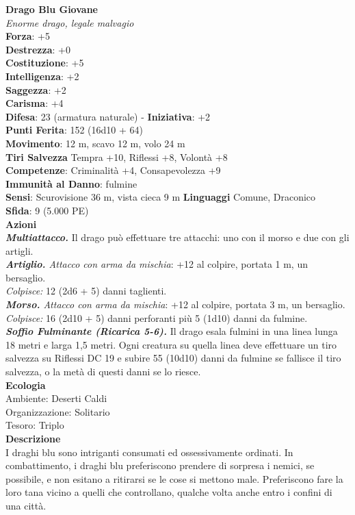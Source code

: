 \begin{multicols}{2}
\medskip\textbf{Drago Blu Giovane}\\
\emph{Enorme drago, legale malvagio}\\
\textbf{Forza}: +5\\
\textbf{Destrezza}: +0\\
\textbf{Costituzione}: +5\\
\textbf{Intelligenza}: +2\\
\textbf{Saggezza}: +2\\
\textbf{Carisma}: +4\\
\textbf{Difesa}: 23 (armatura naturale) - \textbf{Iniziativa}: +2\\
\textbf{Punti Ferita}: 152 (16d10 + 64)\\
\textbf{Movimento}: 12 m, scavo 12 m, volo 24 m\\
\textbf{Tiri Salvezza} Tempra +10, Riflessi +8, Volontà +8\\
\textbf{Competenze}: Criminalità +4, Consapevolezza +9\\
\textbf{Immunità al Danno}: fulmine\\
\textbf{Sensi}: Scurovisione 36 m, vista cieca 9 m
\textbf{Linguaggi} Comune, Draconico\\
\textbf{Sfida}: 9 (5.000 PE)\smallskip\\
\smallskip\textbf{Azioni}\\
\emph{\textbf{Multiattacco.}} Il drago può effettuare tre attacchi: uno con il morso e due con gli artigli.\\
\emph{\textbf{Artiglio.} Attacco con arma da mischia}: +12 al colpire, portata 1 m, un bersaglio.\\
\emph{Colpisce:} 12 (2d6 + 5) danni taglienti.\\
\emph{\textbf{Morso.} Attacco con arma da mischia}: +12 al colpire, portata 3 m, un bersaglio.\\
\emph{Colpisce:} 16 (2d10 + 5) danni perforanti più 5 (1d10) danni da fulmine.\\
\emph{\textbf{Soffio Fulminante (Ricarica 5-6).}} Il drago esala fulmini in una linea lunga 18 metri e larga 1,5 metri. Ogni creatura su quella linea deve effettuare un tiro salvezza su Riflessi DC  19 e subire 55 (10d10) danni da fulmine se fallisce il tiro salvezza, o la metà di questi danni se lo riesce.\\
\textbf{Ecologia}\\
Ambiente: Deserti Caldi\\
Organizzazione: Solitario\\
Tesoro: Triplo\\
\textbf{Descrizione}\\
I draghi blu sono intriganti consumati ed ossessivamente ordinati. In combattimento, i draghi blu preferiscono prendere di sorpresa i nemici, se possibile, e non esitano a ritirarsi se le cose si mettono male. Preferiscono fare la loro tana vicino a quelli che controllano, qualche volta anche entro i confini di una città.\\



\end{multicols}
